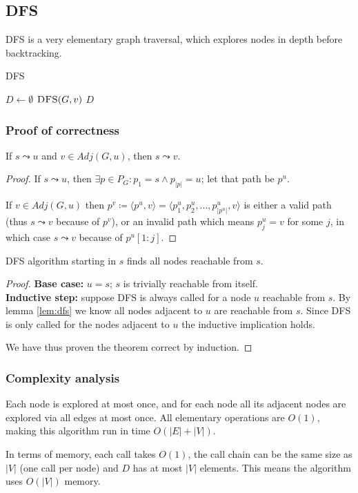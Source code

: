 \subsection{\texorpdfstring{\Acrlong*{DFS}}{Depth-first search}} \label{algorithm-reachability-dfs}
\Acrlong*{DFS} is a very elementary graph traversal, which explores nodes in depth before backtracking.
\begin{algorithm}[h]
    \caption{\Acrlong*{DFS}}
    \label{alg-dfs}
    \begin{algorithmic}[1]
        \State $D \gets \emptyset$
             \Return {$ $}
            \EndIf 
             {$\Call{DFS}{G, v}$}
            \EndFor
            \State \Return $D$
        \EndFunction
    \end{algorithmic}
\end{algorithm}
\subsubsection{Proof of correctness}
\begin{lemma} \label{lem:dfs}
    If $s \leadsto u$ and $v \in Adj(G, u)$, then $s \leadsto v$.
\end{lemma}
\begin{proof}
    If $s \leadsto u$, then $\exists p \in P_G \colon p_1 = s \wedge p_{|p|} = u$; let that path be $p^u$.\par
    If $v \in Adj(G, u)$ then $p^v \coloneqq \langle p^u, v \rangle = \langle p^u_1, p^u_2,...,p^u_{|p^u|}, v\rangle$ is either a valid path (thus $s \leadsto v$ because of $p^v$), or an invalid path which means $p^u_j = v$ for some $j$, in which case $s \leadsto v$ because of $p^u[1:j]$.
\end{proof}
\begin{theorem}
    \Acrlong*{DFS} algorithm starting in $s$ finds all nodes reachable from $s$.
\end{theorem}
\begin{proof} \textbf{Base case:} $u=s$; $s$ is trivially reachable from itself. \\
\textbf{Inductive step:} suppose \textsc{DFS} is always called for a node $u$ reachable from $s$. By lemma \ref{lem:dfs} we know all nodes adjacent to $u$ are reachable from $s$. Since \textsc{DFS} is only called for the nodes adjacent to $u$ the inductive implication holds.\par
We have thus proven the theorem correct by induction.
\end{proof}
\subsubsection{Complexity analysis}
Each node is explored at most once, and for each node all its adjacent nodes are explored via all edges at most once. All elementary operations are $O(1)$, making this algorithm run in time $O(|E|+|V|)$.\par
In terms of memory, each call takes $O(1)$, the call chain can be the same size as $|V|$ (one call per node) and $D$ has at most $|V|$ elements. This means the algorithm uses $O(|V|)$ memory.
